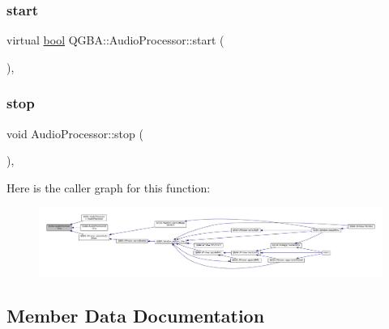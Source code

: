 \subsubsection{\texorpdfstring{start}{start}}
{\footnotesize\ttfamily virtual \mbox{\hyperlink{libretro_8h_a4a26dcae73fb7e1528214a068aca317e}{bool}} Q\+G\+B\+A\+::\+Audio\+Processor\+::start (\begin{DoxyParamCaption}{ }\end{DoxyParamCaption})\hspace{0.3cm}{\ttfamily [pure virtual]}, {\ttfamily [slot]}}

\mbox{\label{class_q_g_b_a_1_1_audio_processor_a0a4f015fcc73aedc7fd158758bb725f1}} 
\subsubsection{\texorpdfstring{stop}{stop}}
{\footnotesize\ttfamily void Audio\+Processor\+::stop (\begin{DoxyParamCaption}{ }\end{DoxyParamCaption})\hspace{0.3cm}{\ttfamily [virtual]}, {\ttfamily [slot]}}

Here is the caller graph for this function\+:
\nopagebreak
\begin{figure}[H]
\begin{center}
\leavevmode
\includegraphics[width=350pt]{class_q_g_b_a_1_1_audio_processor_a0a4f015fcc73aedc7fd158758bb725f1_icgraph}
\end{center}
\end{figure}


\subsection{Member Data Documentation}
\mbox{\label{class_q_g_b_a_1_1_audio_processor_a81ac781505b28492c01b34a6f54e80c8}} 
